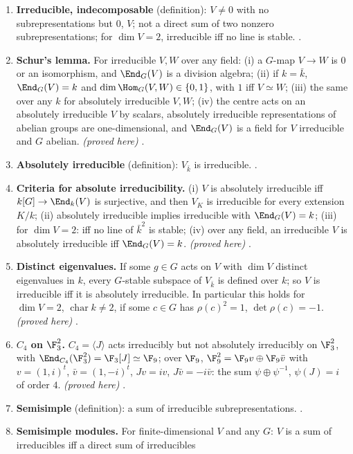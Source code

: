 \begin{enumerate}[label=\textbf{\thechapter.\arabic*}]
{stated; reference)} .
\item \textbf{Irreducible, indecomposable} (definition): $V\ne0$ with no subrepresentations but $0$, $V$; not a direct sum of two nonzero
subrepresentations; for $\dim V=2$, irreducible iff no line is stable. .
\item \textbf{Schur's lemma.} For irreducible $V,W$ over any field: (i) a $G$-map $V\to W$ is $0$ or an isomorphism, and $\End_G(V)$ is a
division algebra; (ii) if $k=\bar k$, $\End_G(V)=k$ and $\dim\Hom_G(V,W)\in\{0,1\}$, with $1$ iff $V\simeq W$; (iii) the same over any $k$
for absolutely irreducible $V,W$; (iv) the centre acts on an absolutely irreducible $V$ by scalars, absolutely irreducible
representations of abelian groups are one-dimensional, and $\End_G(V)$ is a field for $V$ irreducible and $G$ abelian.
\emph{(proved here)} .
\item \textbf{Absolutely irreducible} (definition): $V_{\bar k}$ is irreducible. .
\item \textbf{Criteria for absolute irreducibility.} (i) $V$ is absolutely irreducible iff $k[G]\to\End_k(V)$ is surjective, and then $V_K$
is irreducible for every extension $K/k$; (ii) absolutely irreducible implies irreducible with $\End_G(V)=k$; (iii) for $\dim V=2$:
iff no line of $\bar k^2$ is stable; (iv) over any field, an irreducible $V$ is absolutely irreducible iff $\End_G(V)=k$.
\emph{(proved here)} .
\item \textbf{Distinct eigenvalues.} If some $g\in G$ acts on $V$ with $\dim V$ distinct eigenvalues in $k$, every $G$-stable subspace of
$V_{\bar k}$ is defined over $k$; so $V$ is irreducible iff it is absolutely irreducible. In particular this holds for $\dim V=2$,
$\operatorname{char}k\ne2$, if some $c\in G$ has $\rho(c)^2=1$, $\det\rho(c)=-1$. \emph{(proved here)} .
\item \textbf{$C_4$ on $\F_3^2$.} $C_4=\langle J\rangle$ acts irreducibly but not absolutely irreducibly on $\F_3^2$, with $\End_{C_4}(\F_3^2)=\F_3[J]\simeq\F_9$;
over $\F_9$, $\F_9^2=\F_9v\oplus\F_9\bar v$ with $v=(1,i)^t$, $\bar v=(1,-i)^t$, $Jv=iv$, $J\bar v=-i\bar v$: the sum $\psi\oplus\psi^{-1}$, $\psi(J)=i$ of order
$4$. \emph{(proved here)} .
\item \textbf{Semisimple} (definition): a sum of irreducible subrepresentations. .
\item \textbf{Semisimple modules.} For finite-dimensional $V$ and any $G$: $V$ is a sum of irreducibles iff a direct sum of irreducibles

\end{enumerate}
